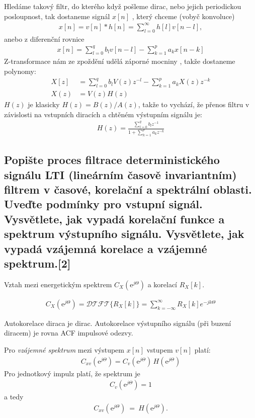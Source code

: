 \documentclass[a4paper,12pt]{article}   %
\newcommand{\mt}[1]{$#1$}
\newcommand{\ejt}{\text{e}^{j\Theta}}
\begin{document}
Hledáme takový filtr, do kterého když pošleme dirac, nebo jejich periodickou posloupnost, tak dostaneme signál \mt{x[n]} , který chceme (vobyč konvoluce)
\begin{align*}
        x[n] = v[n]\ast h[n] = \sum_{l=0}^\infty h[l]v[n-l],
\end{align*}
anebo z diferenční rovnice
\begin{align*}
        x[n] = \sum^q_{l=0} b_l v[n-l] - \sum^p_{k=1}a_k x[n-k]
\end{align*}
Z-transformace nám ze zpoždění udělá záporné mocniny , takže dostaneme polynomy:
\begin{align*}
        X[z] &= \sum^q_{l=0} b_l V(z)z^{-l} - \sum^p_{k=1}a_k X(z)z^{-k}\\
        X(z) &= V(z)H(z)
\end{align*}
\mt{H(z)} je klasicky \mt{H(z) = B(z)/A(z)}, takže to vychází, že přenos filtru v závislosti na vstupních diracích a chtěném výstupním signálu je:
\begin{align*}
        H(z) = \frac{\sum^q_{l=0} b_l z^{-1}}{1 + \sum^p_{k=1} a_k z^{-k}}
\end{align*}


\subsection{Popište proces filtrace deterministického signálu LTI (lineárním časově invariantním) filtrem v časové, korelační a spektrální oblasti. Uveďte podmínky pro vstupní signál. Vysvětlete, jak vypadá korelační funkce a spektrum výstupního signálu. Vysvětlete, jak vypadá vzájemná korelace a vzájemné spektrum.[2]}


Vztah mezi energetickým spektrem $C_X(\ejt)$ a korelací \mt{R_X[k]}.

\begin{align*}
        C_X(\ejt) = \mathscr{DTFT}\{R_X[k]\} = \sum_{k=-\infty}^\infty R_X[k]e^{-jk\Theta}
\end{align*}

Autokorelace diraca je dirac. Autokorelace výstupního signálu (při buzení diracem) je rovna ACF impulsové odezvy. 

Pro \textit{vzájemné spektrum} mezi výstupem \mt{x[n]} vstupem \mt{v[n]} platí:
\begin{align*}
        C_{xv}(\ejt) = C_v(\ejt)\,H(\ejt)
\end{align*}
Pro jednotkový impulz platí, že spektrum je 
\begin{align*}
        C_v(\ejt) = 1
\end{align*}
a tedy
\begin{align*}
        C_{xv}(\ejt)~=~H(\ejt).
\end{align*}
\end{document}
